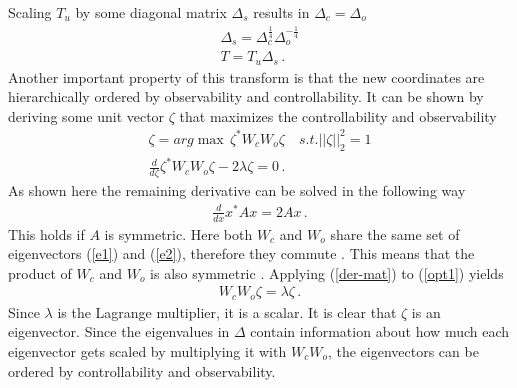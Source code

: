 Scaling \(T_u\) by some diagonal matrix \(\Delta_s\) results in \(\Delta_c = \Delta_o\)
\begin{gather}
\Delta_s = \Delta_c^{\frac{1}{4}}\Delta_o^{-\frac{1}{4}} \\
T = T_u \Delta_s  \,.
\end{gather}
Another important property of this transform is that the new coordinates are hierarchically ordered by observability and controllability.
It can be shown by deriving some unit vector \(\zeta\) that maximizes the controllability and observability
\begin{gather}
\zeta = arg\max \, \zeta^{*}W_cW_o\zeta \quad s.t. ||\zeta||_2^{2} = 1 \\
\frac{d}{d\zeta} \zeta^{*}W_cW_o\zeta - 2\lambda \zeta = 0  \,. \label{opt1}
\end{gather}
As shown here \cite{170373} the remaining derivative can be solved in the following way
\begin{gather}
\frac{d}{dx} x^{*}Ax = 2Ax \,. \label{der-mat}
\end{gather}
This holds if \(A\) is symmetric. 
Here both \(W_c\) and \(W_o\) share the same set of eigenvectors (\ref{e1}) and (\ref{e2}), therefore they commute \cite{170371}.
This means that the product of \(W_c\) and \(W_o\) is also symmetric \cite{170372}.
Applying (\ref{der-mat}) to (\ref{opt1}) yields
\begin{gather}
W_cW_o\zeta = \lambda \zeta \,.
\end{gather}
Since \(\lambda\) is the Lagrange multiplier, it is a scalar. 
It is clear that \(\zeta\) is an eigenvector.
Since the eigenvalues in \(\Delta\) contain information about how much each eigenvector gets scaled by multiplying it with \(W_cW_o\), the eigenvectors can be ordered by controllability and observability.

